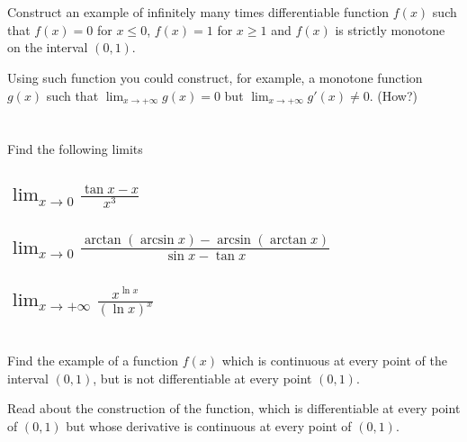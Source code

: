 \documentclass[]{article}
\begin{document}
\newpage
\section{}
Construct an example of infinitely many times differentiable function $f(x)$ such that $f(x) = 0$ for $x \leq 0$, $f(x) = 1$ for $x \geq 1$ and $f(x)$ is strictly monotone on the interval $(0,1)$.

Using such function you could construct, for example, a monotone function $g(x)$ such that $\lim_{x \to +\infty} g(x) = 0$ but $\lim_{x \to +\infty} g'(x) \neq 0$. (How?)




















\newpage
\section{}
Find the following limits

\subsection{
    $\lim_{x \to 0} \frac{\tan{x} - x}{x^3}$
}









\subsection{
    $\lim_{x \to 0} \frac{\arctan(\arcsin{x}) - \arcsin(\arctan{x})}{\sin{x} - \tan{x}}$
}









\subsection{
    $\lim_{x \to +\infty} \frac{x^{\ln{x}}}{(\ln{x})^x}$
}












\newpage
\section{}
Find the example of a function $f(x)$ which is continuous at every point of the interval $(0,1)$, but is not differentiable at every point $(0,1)$.

Read about the construction of the function, which is differentiable at every point of $(0,1)$ but whose derivative is continuous at every point of $(0,1)$.
\end{document}
